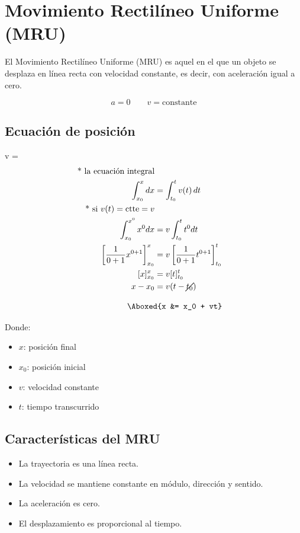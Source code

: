 \section{Movimiento Rectilíneo Uniforme (MRU)}

El Movimiento Rectilíneo Uniforme (MRU) es aquel en el que un objeto se desplaza en línea recta con velocidad constante, es decir, con aceleración igual a cero.
\vspace{-20pt}

\[
a = 0 \qquad v = \text{constante}
\]

\subsection{Ecuación de posición}

{v} =  \quad {}
\begin{align*}
\text{* la ecuación integral}\\
\int_{x_0}^{x} dx &= \int_{t_0}^{t} v(t)\, dt\\
\text{* si } v(t)=\text{ctte}=v\\
\int_{x_0}^{{x^0}} {x^0} dx &= v \int_{t_0}^{t} {t^0} dt\\
\left[\frac{1}{0+1}x^{0+1} \right]_{x_0}^{x} &= v\left[\frac{1}{0+1}t^{0+1}\right]_{t_0}^{t}\\
[x]_{x_0}^{x} &= v[t]_{t_0}^{t}\\
x - x_0 &= v(t - \cancel{t_0})\\
\end{align*}

\vspace{-60pt}

\begin{align*}
    \hspace{1.8cm} \Aboxed{x &= x_0 + vt}
\end{align*}

Donde:
\begin{itemize}
    \setlength{\itemsep}{0pt}
    \item $x$: posición final
    \item $x_0$: posición inicial
    \item $v$: velocidad constante
    \item $t$: tiempo transcurrido
\end{itemize}

\subsection{Características del MRU}

\begin{itemize}
    \setlength{\itemsep}{0pt}
    \item La trayectoria es una línea recta.
    \item La velocidad se mantiene constante en módulo, dirección y sentido.
    \item La aceleración es cero.
    \item El desplazamiento es proporcional al tiempo.
\end{itemize}
